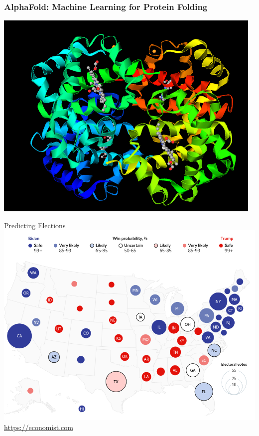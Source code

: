 \documentclass{beamer}
\begin{document}

\begin{frame} \frametitle{AlphaFold: Machine Learning for Protein Folding}
\centering
\includegraphics[width=0.8\linewidth]{../figs/class1/alphafold.png} \\
\end{frame}

\begin{frame}{Predicting Elections}
\centering
\includegraphics[width=0.8\linewidth]{../figs/class1/elections.png} \\
\tiny{\url{https://economist.com}}
\end{frame}
\end{document}
